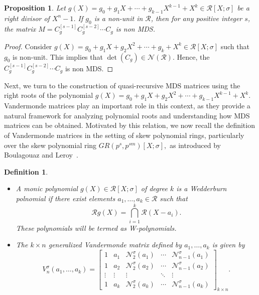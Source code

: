 \documentclass[11pt]{article}
\newtheorem{definition}{Definition}
\newtheorem{proposition}{Proposition}
\begin{document}
\begin{proposition}\label{Prop3} Let   $g(X) = g_0 + g_1X + \cdots + g_{k-1}X^{k-1} + X^k\in \mathcal{R}[X;\sigma]$ be a right divisor of  $X^n-1$. If $g_0$ is a non-unit in $\mathcal{R}$, then for any positive integer $s$, the matrix $M = C_g^{[s-1]} C_g^{[s-2]} \cdots C_g$ is non  MDS. \end{proposition}
\begin{proof}
Consider $g(X)=g_0+g_1X+g_2X^2+\cdots+g_{k}+X^k\in \mathcal{R}[X;\sigma]$ such that $g_0$ is non-unit. This implies that $\det(C_g)\in \mathcal{N}(\mathcal{R})$. Hence, the $C_g^{[s-1]} C_g^{[s-2]} \cdots C_g$ is non MDS.
\end{proof}
Next, we turn to the construction of quasi-recursive MDS matrices using the right roots of the polynomial $g(X)=g_0+g_1X+g_2X^2+\cdots+g_{k-1}X^{k-1}+X^k$. Vandermonde matrices play an important role in this context, as they provide a natural framework for analyzing polynomial roots and understanding how MDS matrices can be obtained. Motivated by this relation, we now recall the definition of Vandermonde matrices in the setting of skew polynomial rings, 
particularly over the skew polynomial ring
\(
GR(p^s, p^{sm})[X;\sigma],
\) 
as introduced by Boulagouaz and Leroy~\cite[Definition~4]{Boulagouaz2013codes}.



\begin{definition}\label{Def01}
	\begin{itemize}
		\item[\textnormal{(i)}]  A monic polynomial \( g(X) \in  \mathcal{R}[X; \sigma] \) of degree \( k \) is a Wedderburn polnomial 
		if there exist elements \( a_1, \dots, a_k \in \mathcal{R} \) such that  
		\[
		\mathcal{R} g(X) = \bigcap_{i=1}^k \mathcal{R}(X - a_i).
		\]  
		These polynomials will be termed as W-polynomials.
		
		\item[\textnormal{(ii)}] The \( k \times n \) generalized Vandermonde matrix defined by \( a_1, \dots, a_k \) is given by
		$$
		V^\sigma_n(a_1, \dots, a_k) =\begin{bmatrix}
1 & a_1 & \mathcal{N}^\sigma_2(a_1) & \cdots & \mathcal{N}^\sigma_{n-1}(a_1) \\
1 & a_2 & \mathcal{N}^\sigma_2(a_2) & \cdots & \mathcal{N}^\sigma_{n-1}(a_2) \\
\vdots & \vdots & \vdots & \ddots & \vdots \\
1 & a_k & \mathcal{N}^\sigma_2(a_k) & \cdots & \mathcal{N}^\sigma_{n-1}(a_k)
\end{bmatrix}_{k\times n}.
$$
	\end{itemize}
	
\end{definition}
\end{document}
